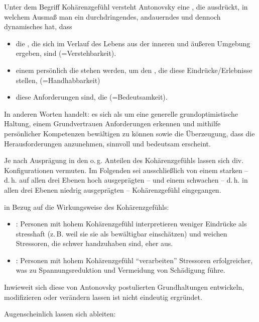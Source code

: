 \Text
{{\TxBeschreibung}}%
{%
Unter dem Begriff Kohärenzgefühl versteht Antonovsky eine
, die ausdrückt, in welchem Ausmaß
man ein durchdringendes, andauerndes und dennoch dynamisches
 hat, dass
\begin{itemize}
  \item die , die sich im Verlauf des Lebens aus
  der inneren und äußeren Umgebung ergeben,  sind (=Verstehbarkeit).
  \item einem persönlich die  stehen werden,
  um den , die diese Eindrücke/Erlebnisse stellen,  (=Handhabbarkeit)
  \item diese Anforderungen  sind, die
   (=Bedeutsamkeit).
\end{itemize}
In anderen Worten handelt: es sich als um eine
generelle grundoptimistische Haltung, einem Grundvertrauen Anforderungen erkennen und mithilfe persönlicher Kompetenzen bewältigen zu können sowie die Überzeugung, dass die Herausforderungen anzunehmen, sinnvoll und bedeutsam erscheint. 

Je nach Ausprägung in den o.\,g. Anteilen des
Kohärenzgefühls lassen sich div. Konfigurationen vermuten.
Im Folgenden sei ausschließlich von einem starken -- d.\,h. auf allen drei Ebenen hoch ausgeprägten -- und einem schwachen -- d.\,h. in
allen drei Ebenen niedrig ausgeprägten -- Kohärenzgefühl
eingegangen.

 in Bezug auf die Wirkungsweise des
Kohärenzgefühls:
\begin{itemize}
  \item {}:
  Personen mit hohem Kohärenzgefühl interpretieren weniger
  Eindrücke als stresshaft (z.\,B. weil sie sie als bewältigbar einschätzen) und weichen Stressoren, die schwer
  handzuhaben sind, eher aus.
  \item {}: Personen
  mit hohem Kohärenzgefühl \enquote{verarbeiten} Stressoren erfolgreicher, was zu
  Spannungsreduktion und Vermeidung von Schädigung führe.
\end{itemize}
Inwieweit sich diese von Antonovsky postulierten
Grundhaltungen entwickeln, modifizieren oder verändern
lassen ist nicht eindeutig ergründet.

Augenscheinlich lassen sich  ableiten:

}
